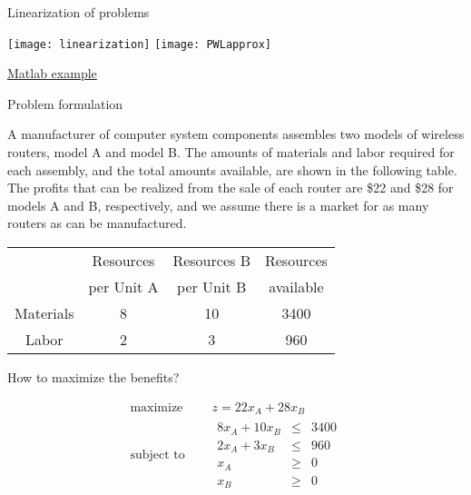 \documentclass[c]{beamer}
\begin{document}
\begin{frame}{Linearization of problems}
  \begin{center}
    \texttt{[image: linearization]}
    \texttt{[image: PWLapprox]}

  \href{https://es.mathworks.com/help/slcontrol/ug/linearizing-nonlinear-models.html}{Matlab example}
  \end{center}
\end{frame}

\begin{frame}[allowframebreaks]{Problem formulation}
  \begin{Exercise}
    A manufacturer of computer system components assembles two models of wireless routers, model A and model B. The amounts of materials and labor required for each assembly, and the total amounts available, are shown in the following table. The profits that can be realized from the sale of each router are \$22 and \$28 for models A and B, respectively, and we assume there is a market for as many routers as can be manufactured.\cite{carter}
    \begin{center}
    \begin{tabular}{cccc}
      & Resources  & Resources  B & Resources  \\
      & per Unit A &  per Unit B &  available \\\hline
      Materials & 8 & 10 & 3400\\
      Labor & 2 & 3 & 960\\\hline
    \end{tabular}
  \end{center}
  How to maximize the benefits?
  \end{Exercise}
  \framebreak
  \begin{equation*}
    \begin{aligned}
      \text{maximize } \quad & z = 22 x_A+28x_B \\
      \text{subject to }\quad &
      \begin{array}{rcl}
        8x_A+10x_B &\leq &3400 \\
        2x_A+3x_B &\leq &960 \\
        x_A &\geq &0 \\
        x_B &\geq& 0
      \end{array}
    \end{aligned}
  \end{equation*}

\framebreak


\end{frame}
\end{document}
